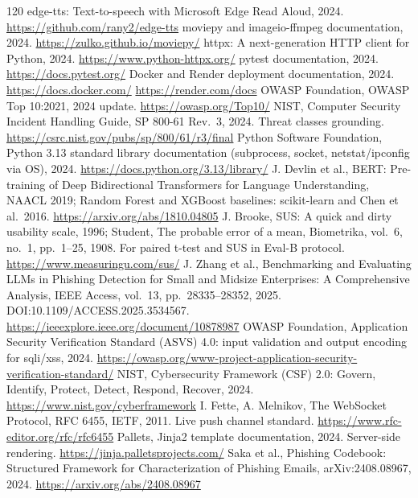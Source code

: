 \documentclass[11pt,a4paper]{article}
\begin{document}
\begin{thebibliography}{120}
 edge-tts: Text-to-speech with Microsoft Edge Read Aloud, 2024. \url{https://github.com/rany2/edge-tts}
 moviepy and imageio-ffmpeg documentation, 2024. \url{https://zulko.github.io/moviepy/}
 httpx: A next-generation HTTP client for Python, 2024. \url{https://www.python-httpx.org/}
 pytest documentation, 2024. \url{https://docs.pytest.org/}
 Docker and Render deployment documentation, 2024. \url{https://docs.docker.com/} \url{https://render.com/docs}
 OWASP Foundation, OWASP Top 10:2021, 2024 update. \url{https://owasp.org/Top10/}
 NIST, Computer Security Incident Handling Guide, SP 800-61 Rev.~3, 2024. Threat classes grounding. \url{https://csrc.nist.gov/pubs/sp/800/61/r3/final}
 Python Software Foundation, Python 3.13 standard library documentation (subprocess, socket, netstat/ipconfig via OS), 2024. \url{https://docs.python.org/3.13/library/}
 J. Devlin et al., BERT: Pre-training of Deep Bidirectional Transformers for Language Understanding, NAACL 2019; Random Forest and XGBoost baselines: scikit-learn and Chen et al.\ 2016. \url{https://arxiv.org/abs/1810.04805}
 J. Brooke, SUS: A quick and dirty usability scale, 1996; Student, The probable error of a mean, Biometrika, vol.~6, no.~1, pp.~1--25, 1908. For paired t-test and SUS in Eval-B protocol. \url{https://www.measuringu.com/sus/}
 J. Zhang et al., Benchmarking and Evaluating LLMs in Phishing Detection for Small and Midsize Enterprises: A Comprehensive Analysis, IEEE Access, vol.~13, pp.~28335--28352, 2025. DOI:10.1109/ACCESS.2025.3534567. \url{https://ieeexplore.ieee.org/document/10878987}
 OWASP Foundation, Application Security Verification Standard (ASVS) 4.0: input validation and output encoding for sqli/xss, 2024. \url{https://owasp.org/www-project-application-security-verification-standard/}
 NIST, Cybersecurity Framework (CSF) 2.0: Govern, Identify, Protect, Detect, Respond, Recover, 2024. \url{https://www.nist.gov/cyberframework}
 I. Fette, A. Melnikov, The WebSocket Protocol, RFC 6455, IETF, 2011. Live push channel standard. \url{https://www.rfc-editor.org/rfc/rfc6455}
 Pallets, Jinja2 template documentation, 2024. Server-side rendering. \url{https://jinja.palletsprojects.com/}
 Saka et al., Phishing Codebook: Structured Framework for Characterization of Phishing Emails, arXiv:2408.08967, 2024. \url{https://arxiv.org/abs/2408.08967}
\end{thebibliography}
\end{document}
